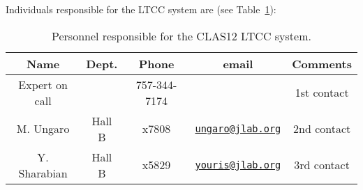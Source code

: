 Individuals responsible for the LTCC system are (see Table~\ref{tb:ltcc}):

\begin{table}[!htb]
\centering
\begin{tabular}{|c|c|c|c|c|} \hline
Name           & Dept.& Phone        & email & Comments \\ \hline
Expert on call &      & 757-344-7174 &       & 1st contact \\ \hline
M. Ungaro      & Hall B & x7808 &\href{mailto:ungaro@jlab.org}{\nolinkurl{ungaro@jlab.org}}&2nd contact \\ \hline
Y. Sharabian   & Hall B & x5829 &\href{mailto:youris@jlab.org}{\nolinkurl{youris@jlab.org}}&3rd contact \\ \hline
 \end{tabular}
\caption{Personnel responsible for the CLAS12 LTCC system.} 
\label{tb:ltcc}
\end{table}

